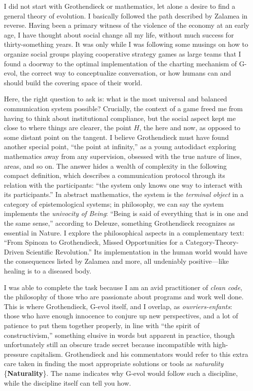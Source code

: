 \documentclass[11pt]{article}
\newcommand{\keyterm}[1]{\textbf{#1}}
\begin{document}
I did not start with Grothendieck or mathematics, let alone a desire to find a
general theory of evolution. I basically followed the path described by Zalamea
in reverse. Having been a primary witness of the violence of the economy at an
early age, I have thought about social change all my life, without much success
for thirty-something years. It was only while I was following some musings on
how to organize social groups playing cooperative strategy games as large teams
that I found a doorway to the optimal implementation of the charting mechanism
of G-evol, the correct way to conceptualize conversation, or how humans can and
should build the covering space of their world.

Here, the right question to ask is: what is the most universal and balanced
communication system possible? Crucially, the context of a game freed me from
having to think about institutional compliance, but the social aspect kept me
close to where things are clearer, the point \(H\), the here and now, as
opposed to some distant point on the tangent. I believe Grothendieck must have
found another special point, ``the point at infinity,'' as a young autodidact
exploring mathematics away from any supervision, obsessed with the true nature
of lines, areas, and so on. The answer hides a wealth of complexity in the
following compact definition, which describes a communication protocol through
its relation with the participants: ``the system only knows one way to interact
with its participants.'' In abstract mathematics, the system is the
\emph{terminal object} in a category of epistemological systems; in philosophy,
we can say the system implements the \emph{univocity of Being}: ``Being is said
of everything that is in one and the same sense,'' according to Deleuze,
something Grothendieck recognizes as essential in Nature. I explore the
philosophical aspects in a complementary text: ``From Spinoza to
Grothendieck, Missed Opportunities for a Category-Theory-Driven Scientific
Revolution.'' Its implementation in the human world would have the consequences
listed by Zalamea and more, all undeniably positive---like healing is to a
diseased body.

I was able to complete the task because I am an avid practitioner of
\emph{clean code}, the philosophy of those who are passionate about programs
and work well done. This is where Grothendieck, G-evol itself, and I overlap,
as \emph{ouvriers-enfants}: those who have enough innocence to conjure up new
perspectives, and a lot of patience to put them together properly, in line with
``the spirit of constructivism,'' something elusive in words but apparent in
practice, though unfortunately still an obscure trade secret because
incompatible with high-pressure capitalism. Grothendieck and his commentators
would refer to this extra care taken in finding the most appropriate solutions
or tools as \emph{naturality} \{\keyterm{Naturality}\}. The name indicates why
G-evol would follow such a discipline, while the discipline itself can tell you
how.
\end{document}
